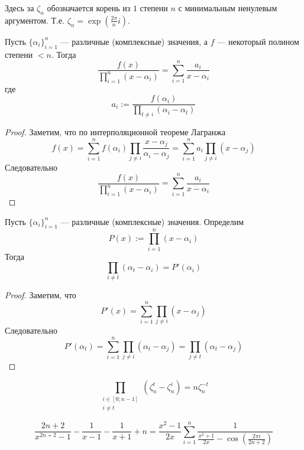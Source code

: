 \documentclass[12pt,a4paper]{article}
\begin{document}
    \begin{enumproblem}[1.71.3]
        \begin{remark*}
            Здесь за $\zeta_n$ обозначается корень из $1$ степени $n$ с минимальным ненулевым аргументом. Т.е. $\zeta_n = \exp(\frac{2\pi}{n}i)$.
        \end{remark*}

        \begin{lemma}
            Пусть $\{\alpha_i\}_{i=1}^n$ --- различные (комплексные) значения, а $f$ --- некоторый полином степени $< n$. Тогда
            \[\frac{f(x)}{\prod_{i=1}^n (x - \alpha_i)} = \sum_{i=1}^n \frac{a_i}{x-\alpha_i}\]
            где
            \[a_i := \frac{f(\alpha_i)}{\prod_{t \neq i} (\alpha_i - \alpha_t)}\] 
        \end{lemma}
    
        \begin{proof}
            Заметим, что по интерполяционной теореме Лагранжа
            \[
                f(x)
                = \sum_{i=1}^n f(\alpha_i) \prod_{j \neq i} \frac{x - \alpha_j}{\alpha_i - \alpha_j}
                = \sum_{i=1}^n a_i \prod_{j \neq i} (x - \alpha_j)
            \]
            Следовательно
            \[\frac{f(x)}{\prod_{i=1}^n (x - \alpha_i)} = \sum_{i=1}^n \frac{a_i}{x-\alpha_i}\]
        \end{proof}
    
        \begin{lemma}
            Пусть $\{\alpha_i\}_{i=1}^n$ --- различные (комплексные) значения. Определим
            \[P(x) := \prod_{i=1}^n (x - \alpha_i)\]
            Тогда
            \[\prod_{i \neq t} (\alpha_t - \alpha_i) = P'(\alpha_i)\]
        \end{lemma}
    
        \begin{proof}
            Заметим, что
            \[P'(x) = \sum_{i=1}^n \prod_{j \neq i} (x - \alpha_j)\]
            Следовательно
            \[P'(\alpha_t) = \sum_{i=1}^n \prod_{j \neq i} (\alpha_t - \alpha_j) = \prod_{j \neq t} (\alpha_t - \alpha_j)\]
        \end{proof}
    
        \begin{corollary}
            \[\prod_{\substack{i \in [0; n-1]\\ i \neq t}} (\zeta_n^t - \zeta_n^i) = n\zeta_n^{-t}\]
        \end{corollary}
    
        \begin{theorem}
            \[\frac{2n+2}{x^{2n+2}-1} - \frac{1}{x-1} - \frac{1}{x+1} + n = \frac{x^2-1}{2x} \sum_{i=1}^n \frac{1}{\frac{x^2+1}{2x} - \cos(\frac{2\pi i}{2n+2})}\]
        \end{theorem}
    

\end{enumproblem}
\end{document}
